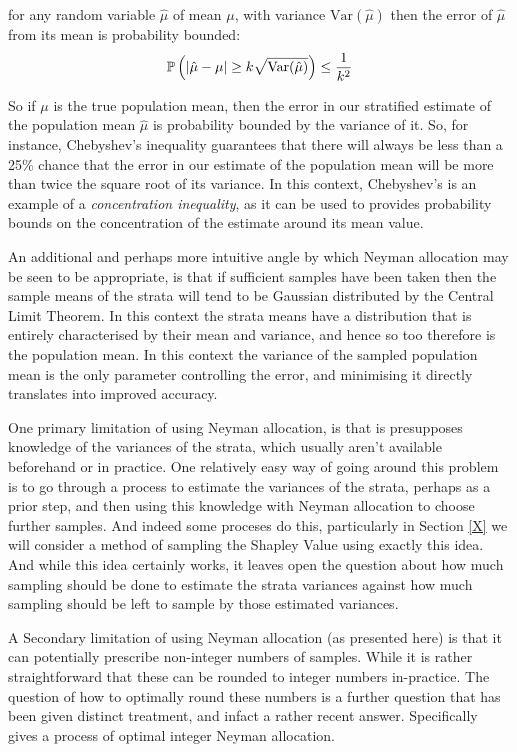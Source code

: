 \begin{theorem}\label{thm:chebyshevs}
for any random variable $\hat{\mu}$ of mean $\mu$, with variance $\text{Var}(\hat{\mu})$ then the error of $\hat{\mu}$ from its mean is probability bounded:
$$ \operatorname{\mathbb{P}}\left(|\hat{\mu}-\mu|\ge k\sqrt{\text{Var}(\hat{\mu})}\right)\le\frac{1}{k^2} $$
\end{theorem}

So if $\mu$ is the true population mean, then the error in our stratified estimate of the population mean $\hat{\mu}$ is probability bounded by the variance of it.
So, for instance, Chebyshev's inequality guarantees that there will always be less than a 25\% chance that the error in our estimate of the population mean will be more than twice the square root of its variance.
In this context, Chebyshev's is an example of a \textit{concentration inequality}, as it can be used to provides probability bounds on the concentration of the estimate around its mean value.

An additional and perhaps more intuitive angle by which Neyman allocation may be seen to be appropriate, is that if sufficient samples have been taken then the sample means of the strata will tend to be Gaussian distributed by the Central Limit Theorem.
In this context the strata means have a distribution that is entirely characterised by their mean and variance, and hence so too therefore is the population mean.
In this context the variance of the sampled population mean is the only parameter controlling the error, and minimising it directly translates into improved accuracy.

One primary limitation of using Neyman allocation, is that is presupposes knowledge of the variances of the strata, which usually aren't available beforehand or in practice.
One relatively easy way of going around this problem is to go through a process to estimate the variances of the strata, perhaps as a prior step, and then using this knowledge with Neyman allocation to choose further samples.
And indeed some proceses do this, particularly in Section \ref{X} we will consider a method of sampling the Shapley Value using exactly this idea.
And while this idea certainly works, it leaves open the question about how much sampling should be done to estimate the strata variances against how much sampling should be left to sample by those estimated variances.

A Secondary limitation of using Neyman allocation (as presented here) is that it can potentially prescribe non-integer numbers of samples. While it is rather straightforward that these can be rounded to integer numbers in-practice. The question of how to optimally round these numbers is a further question that has been given distinct treatment, and infact a rather recent answer.
Specifically \cite{WRIGHT201750} gives a process of optimal integer Neyman allocation.

